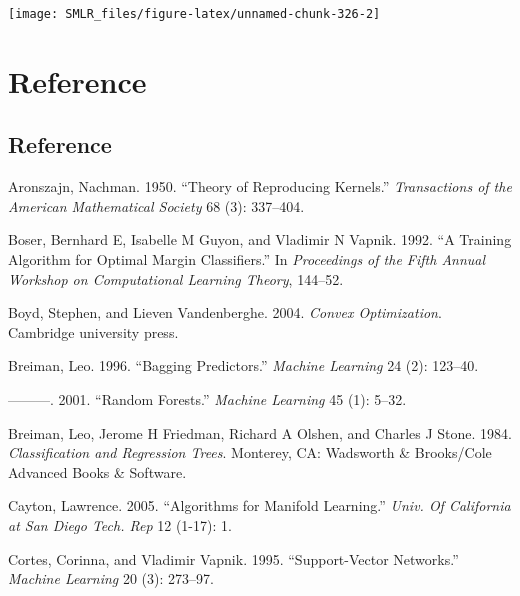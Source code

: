 \documentclass[
]{book}
\newlength{\cslhangindent}
\newlength{\cslentryspacingunit} %
\newenvironment{CSLReferences}[2] %
 {%
  \setlength{\parindent}{0pt}
  \ifodd #1
  \let\oldpar\par
  \def\par{\hangindent=\cslhangindent\oldpar}
  \fi
  \setlength{\parskip}{#2\cslentryspacingunit}
 }%
 {}
\theoremstyle{definition}
\theoremstyle{definition}
\theoremstyle{definition}
\theoremstyle{definition}
\theoremstyle{remark}
\begin{document}
\begin{center}\texttt{[image: SMLR\_files/figure-latex/unnamed-chunk-326-2]} \end{center}

\hypertarget{part-reference}{%
\part{Reference}\label{part-reference}}

\hypertarget{reference}{%
\chapter{Reference}\label{reference}}

\hypertarget{refs}{}
\begin{CSLReferences}{1}{0}
\leavevmode{}%
Aronszajn, Nachman. 1950. {``Theory of Reproducing Kernels.''} \emph{Transactions of the American Mathematical Society} 68 (3): 337--404.

\leavevmode{}%
Boser, Bernhard E, Isabelle M Guyon, and Vladimir N Vapnik. 1992. {``A Training Algorithm for Optimal Margin Classifiers.''} In \emph{Proceedings of the Fifth Annual Workshop on Computational Learning Theory}, 144--52.

\leavevmode{}%
Boyd, Stephen, and Lieven Vandenberghe. 2004. \emph{Convex Optimization}. Cambridge university press.

\leavevmode{}%
Breiman, Leo. 1996. {``Bagging Predictors.''} \emph{Machine Learning} 24 (2): 123--40.

\leavevmode{}%
---------. 2001. {``Random Forests.''} \emph{Machine Learning} 45 (1): 5--32.

\leavevmode{}%
Breiman, Leo, Jerome H Friedman, Richard A Olshen, and Charles J Stone. 1984. \emph{Classification and Regression Trees}. Monterey, CA: Wadsworth \& Brooks/Cole Advanced Books \& Software.

\leavevmode{}%
Cayton, Lawrence. 2005. {``Algorithms for Manifold Learning.''} \emph{Univ. Of California at San Diego Tech. Rep} 12 (1-17): 1.

\leavevmode{}%
Cortes, Corinna, and Vladimir Vapnik. 1995. {``Support-Vector Networks.''} \emph{Machine Learning} 20 (3): 273--97.


\end{CSLReferences}
\end{document}
